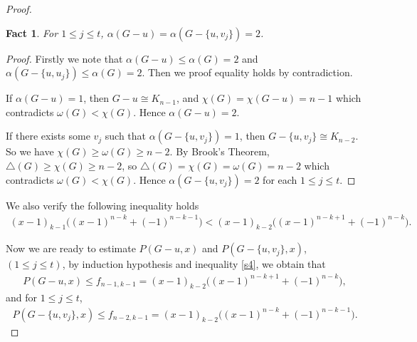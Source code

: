 \documentclass[12pt]{article}
\newtheorem{fact}{Fact}
\theoremstyle{definition}
\begin{document}
\begin{proof}
\begin{fact}\label{d} For $1\leq j\leq t$, $\alpha(G-u)=\alpha(G-\{u,v_{j}\})=2$.\end{fact}
\begin{proof} Firstly we note that $\alpha(G-u)\leq \alpha(G)=2$ and $\alpha(G-\{u,u_{j}\})\leq\alpha(G)=2$. Then we proof equality holds by contradiction.

If $\alpha(G-u)=1$, then $G-u\cong K_{n-1}$, and $\chi(G)=\chi(G-u)=n-1$ which contradicts $\omega(G)<\chi(G)$. Hence $\alpha(G-u)=2$.

If there exists some $v_j$ such that $\alpha(G-\{u,v_{j}\})=1$,
then $G-\{u,v_{j}\}\cong K_{n-2}$. So we have $\chi(G)\geq\omega(G)\geq n-2$.
By Brook's Theorem, $\triangle(G)\geq \chi(G)\geq n-2$, so $\triangle(G)=\chi(G)=\omega(G)=n-2$ which contradicts $\omega(G)<\chi(G)$.
Hence $\alpha(G-\{u,v_{j}\})=2$ for each $1\leq j\leq t$.
\end{proof}

We also verify the following inequality holds
\begin{eqnarray}\label{s4}(x-1)_{k-1}\big((x-1)^{n-k}+(-1)^{n-k-1}\big)< (x-1)_{k-2}\big((x-1)^{n-k+1}+(-1)^{n-k}\big).\end{eqnarray}

Now we are ready to estimate $P(G-u,x)$ and $P(G-\{u,v_{j}\},x)$, $(1\leq j\leq t)$, by induction hypothesis and inequality \eqref{s4}, we obtain that
\begin{eqnarray}\label{s5} P(G-u,x)\leq f_{n-1,k-1}=(x-1)_{k-2}\big((x-1)^{n-k+1}+(-1)^{n-k}\big),
\end{eqnarray}
and for $1\leq j\leq t$,
\begin{eqnarray}\label{s6} P(G-\{u,v_{j}\},x)\leq f_{n-2,k-1}=(x-1)_{k-2}\big((x-1)^{n-k}+(-1)^{n-k-1}\big).
\end{eqnarray}


\end{proof}
\end{document}
